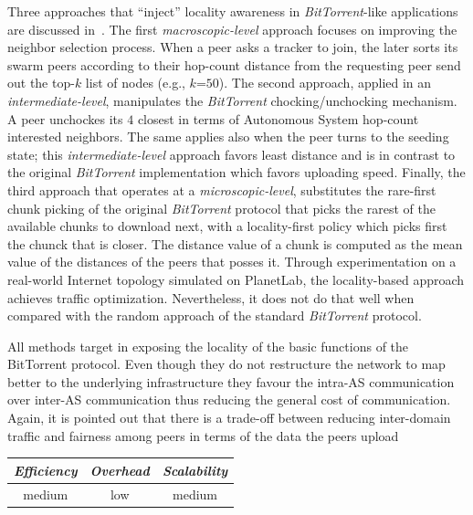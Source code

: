 Three approaches that ``inject'' locality awareness 
in {\sl BitTorrent}-like applications are discussed in~\cite{LCLX2009}. The
first \emph{macroscopic-level} approach
focuses on improving the neighbor selection process. 
When a peer asks a tracker to join, 
the later sorts its swarm peers according to
their hop-count distance from the requesting peer 
send out the top-$k$ list of nodes (e.g., $k$=$50$).
The second approach, applied in an \emph{intermediate-level}, manipulates the
{\sl BitTorrent} chocking/unchocking mechanism. A peer unchockes its $4$
closest in terms of 
Autonomous System
hop-count interested neighbors. 
The same applies also when the peer turns to 
the seeding state;  this  \emph{intermediate-level} approach favors
least distance and is in contrast to the original {\sl BitTorrent} 
implementation which favors uploading speed.
Finally, the third approach that operates at 
a \emph{microscopic-level}, substitutes the rare-first chunk picking of the
original {\sl BitTorrent} protocol that picks the rarest of the available
chunks to download next, with a locality-first policy which picks first the
chunck that is closer. The distance value of a chunk is computed as the mean
value of the distances of the peers that posses it.
Through experimentation on a real-world Internet topology simulated on
PlanetLab, the locality-based approach achieves traffic optimization.
Nevertheless, it does not do that well when compared with the
random approach of the standard {\sl BitTorrent} protocol.

All methods target in exposing the locality of the basic functions of the
BitTorrent protocol. Even though they do not restructure the network to map
better to the underlying infrastructure they favour the intra-AS communication
over inter-AS communication thus reducing the general cost of communication.
Again, it is pointed out that there is a trade-off between reducing inter-domain
traffic and fairness among peers in terms of the data the peers upload

\begin{center}
{\footnotesize
\begin{tabular}{ccc}
\emph{Efficiency} & \emph{Overhead} & \emph{Scalability} \\
\hline
medium &
low &
medium
\end{tabular}
}
\end{center}


